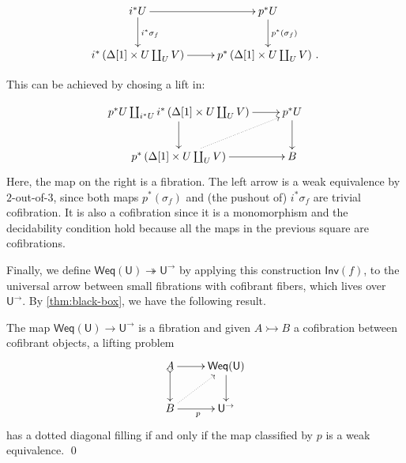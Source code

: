 \documentclass[reqno,10pt,a4paper,oneside,draft]{amsart}
\makeatletter
\renewenvironment{proof}[1][\proofname] {\par\pushQED{\qed}\normalfont\topsep6\p@\@plus6\p@\relax\trivlist\item[\hskip\labelsep\bf#1\@addpunct{.}]\ignorespaces}{\popQED\endtrivlist\@endpefalse}
\numberwithin{equation}{section}
\theoremstyle{mythm}
\theoremstyle{mydef}
\theoremstyle{myrmk}
\newcommand{\co}{\colon}
\newcommand{\SSet}{\mathbf{SSet}}
\newcommand{\U}{\mathsf{U}}
\newcommand{\Weq}{\mathsf{Weq}}
\newcommand{\Iseq}{\mathsf{Inv}}
\makeatother
\begin{document}
\begin{proof}
\[
\xymatrix{
i^* U \ar[r] \ar[d]^{i^* \sigma_f} & p^* U   \ar[d]^{p^*(\sigma_f)} \\
i^*\left( \Delta[1] \times U \coprod_U V \right) \ar[r] & p^* \left( \Delta[1] \times U \coprod_U V \right) \, .
}
\]

This can be achieved by chosing a lift in:

\[
\xymatrix{  p^* U \coprod_{i^* U} i^*\left( \Delta[1] \times U \coprod_U V \right) \ar[r] \ar[d] & p^* U   \ar[d] \\
p^* \left( \Delta[1] \times U \coprod_U V \right) \ar[r] \ar@{.>}[ur] & B
}
\]
Here, the map on the right is a fibration. The left arrow is a weak equivalence by $2$-out-of-$3$, since both maps $p^*(\sigma_f)$ and (the pushout of) $i^* \sigma_f$ are trivial cofibration. It is also a cofibration since it is a monomorphism and the decidability condition hold because all the maps in the previous square are cofibrations.
\end{proof}



Finally, we define $\Weq(\U) \twoheadrightarrow \U^\to$ by applying this construction $\Iseq(f)$, to the universal arrow between small fibrations with cofibrant fibers, which lives over $\U^\to$. By \cref{thm:black-box}, we have the following result.

\begin{proposition} \label{prop:Weq_classify_Weq}
The map $\Weq(\U) \to \U^\to$ is a fibration and given $A \rightarrowtail B$ a cofibration between cofibrant objects, a lifting problem
\[
\xymatrix{ A \ar[r] \ar@{>->}[d] & \mathsf{Weq}(\U) \ar[d] \\
B \ar@{.>}[ur] \ar[r]_{p} & \U^\to
}
\]
has a dotted diagonal filling if and only if the map classified by $p$ is a weak equivalence. \qed
\end{proposition}





\end{document}
